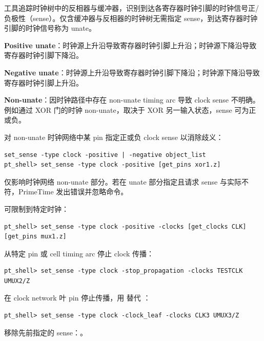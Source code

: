 工具追踪时钟树中的反相器与缓冲器，识别到达各寄存器时钟引脚的时钟信号正/负极性（sense）。仅含缓冲器与反相器的时钟树无需指定 sense，到达寄存器时钟引脚的时钟信号称为 unate。

\textbf{Positive unate}：时钟源上升沿导致寄存器时钟引脚上升沿；时钟源下降沿导致寄存器时钟引脚下降沿。

\textbf{Negative unate}：时钟源上升沿导致寄存器时钟引脚下降沿；时钟源下降沿导致寄存器时钟引脚上升沿。


\textbf{Non-unate}：因时钟路径中存在 non-unate timing arc 导致 clock sense 不明确。例如通过 XOR 门的时钟 non-unate，取决于 XOR 另一输入状态，sense 可为正或负。


对 non-unate 时钟网络中某 pin 指定正或负 clock sense 以消除歧义：
\begin{lstlisting}
set_sense -type clock -positive | -negative object_list
pt_shell> set_sense -type clock -positive [get_pins xor1.z]
\end{lstlisting}

 仅影响时钟网络 non-unate 部分。若在 unate 部分指定且请求 sense 与实际不符，PrimeTime 发出错误并忽略命令。

可限制到特定时钟：
\begin{lstlisting}
pt_shell> set_sense -type clock -positive -clocks [get_clocks CLK] [get_pins mux1.z]
\end{lstlisting}


从特定 pin 或 cell timing arc 停止 clock 传播：
\begin{lstlisting}
pt_shell> set_sense -type clock -stop_propagation -clocks TESTCLK UMUX2/Z
\end{lstlisting}

在 clock network 叶 pin 停止传播，用  替代 ：
\begin{lstlisting}
pt_shell> set_sense -type clock -clock_leaf -clocks CLK3 UMUX3/Z
\end{lstlisting}

移除先前指定的 sense：。

